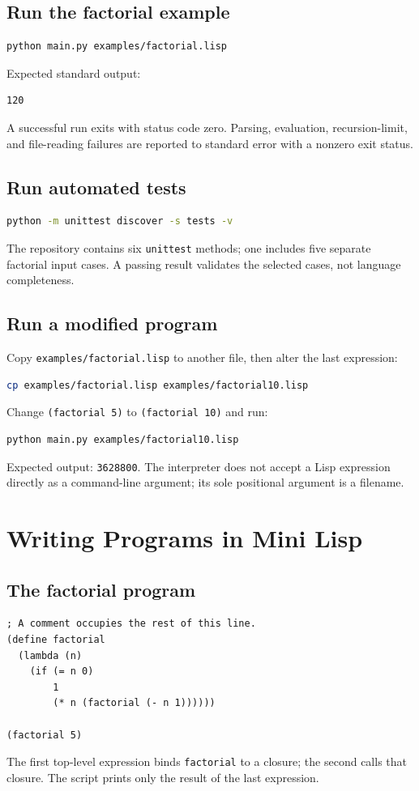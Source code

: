 \documentclass[11pt,a4paper,oneside]{report}
\begin{document}
\section{Run the factorial example}
\begin{lstlisting}[language=bash]
python main.py examples/factorial.lisp
\end{lstlisting}
Expected standard output:
\begin{lstlisting}
120
\end{lstlisting}
A successful run exits with status code zero. Parsing, evaluation, recursion-limit, and file-reading failures are reported to standard error with a nonzero exit status.
\section{Run automated tests}
\begin{lstlisting}[language=bash]
python -m unittest discover -s tests -v
\end{lstlisting}
The repository contains six \texttt{unittest} methods; one includes five separate factorial input cases. A passing result validates the selected cases, not language completeness.
\section{Run a modified program}
Copy \texttt{examples/factorial.lisp} to another file, then alter the last expression:
\begin{lstlisting}[language=bash]
cp examples/factorial.lisp examples/factorial10.lisp
\end{lstlisting}
Change \texttt{(factorial 5)} to \texttt{(factorial 10)} and run:
\begin{lstlisting}[language=bash]
python main.py examples/factorial10.lisp
\end{lstlisting}
Expected output: \texttt{3628800}. The interpreter does not accept a Lisp expression directly as a command-line argument; its sole positional argument is a filename.

\chapter{Writing Programs in Mini Lisp}
\section{The factorial program}
\begin{lstlisting}
; A comment occupies the rest of this line.
(define factorial
  (lambda (n)
    (if (= n 0)
        1
        (* n (factorial (- n 1))))))

(factorial 5)
\end{lstlisting}
The first top-level expression binds \texttt{factorial} to a closure; the second calls that closure. The script prints only the result of the last expression.
\end{document}
